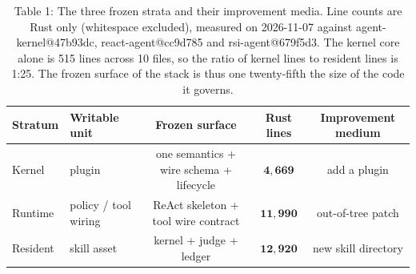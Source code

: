 \begin{table}[t]
\centering
\caption{Table 1: The three frozen strata and their improvement media. Line counts are Rust only (whitespace excluded), measured on 2026-11-07 against agent-kernel@47b93dc, react-agent@cc9d785 and rsi-agent@679f5d3. The kernel core alone is 515 lines across 10 files, so the ratio of kernel lines to resident lines is 1:25. The frozen surface of the stack is thus one twenty-fifth the size of the code it governs.}
\label{tab:strata}
\begin{tabular}{llccc}
\toprule
\textbf{Stratum} & \textbf{Writable unit} & \textbf{Frozen surface} & \textbf{Rust lines} & \textbf{Improvement medium} \\
\midrule
Kernel & plugin & one semantics + wire schema + lifecycle & $\mathbf{4,669}$ & add a plugin \\
Runtime & policy / tool wiring & ReAct skeleton + tool wire contract & $\mathbf{11,990}$ & out-of-tree patch \\
Resident & skill asset & kernel + judge + ledger & $\mathbf{12,920}$ & new skill directory \\
\bottomrule
\end{tabular}
\end{table}
